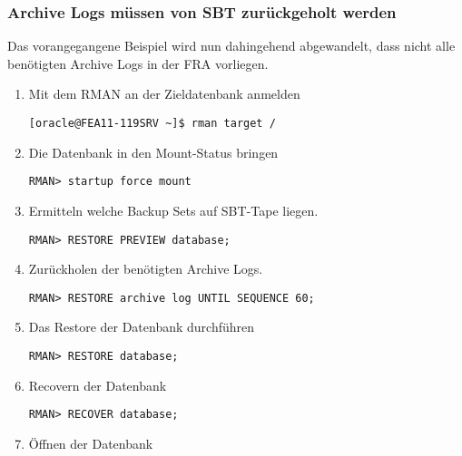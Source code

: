         \subsubsection{Archive Logs  m\"ussen von SBT zur\"uckgeholt werden}
          Das vorangegangene Beispiel wird nun dahingehend abgewandelt, dass nicht alle ben\"otigten Archive Logs in der FRA vorliegen.
          \begin{enumerate}
            \item Mit dem RMAN an der Zieldatenbank anmelden
              \begin{lstlisting}[caption={An der Zieldatenbank anmelden},label=admin1445,language=rman]
[oracle@FEA11-119SRV ~]$ rman target /
              \end{lstlisting}
            \item Die Datenbank in den Mount-Status bringen
              \begin{lstlisting}[caption={Datenbank mounten},label=admin1446,language=rman,alsolanguage=sqlplus]
RMAN> startup force mount
            \end{lstlisting}
            \item Ermitteln welche Backup Sets auf SBT-Tape liegen.
              \begin{lstlisting}[caption={Ermitteln der ben\"otigten Dateien},label=admin1447,language=rman]
RMAN> RESTORE PREVIEW database;
              \end{lstlisting}
            \item Zur\"uckholen der ben\"otigten Archive Logs.
              \begin{lstlisting}[caption={Restore der Archive Logs von SBT in die FRA},label=admin1448,language=rman]
RMAN> RESTORE archive log UNTIL SEQUENCE 60;
              \end{lstlisting}
            \item Das Restore der Datenbank durchf\"uhren
              \begin{lstlisting}[caption={Restore der Datendateien},label=admin1449,language=rman]
RMAN> RESTORE database;
              \end{lstlisting}
            \item Recovern der Datenbank
              \begin{lstlisting}[caption={Recovery der Datenbank},label=admin1450,language=rman]
RMAN> RECOVER database;
              \end{lstlisting}
            \item \"Offnen der Datenbank

\end{enumerate}
